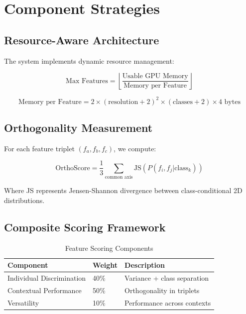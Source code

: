 \documentclass[11pt,a4paper]{article}
\begin{document}
\section{Component Strategies}

\subsection{Resource-Aware Architecture}

The system implements dynamic resource management:

\begin{equation}
\text{Max Features} = \left\lfloor \frac{\text{Usable GPU Memory}}{\text{Memory per Feature}} \right\rfloor
\end{equation}

\begin{equation}
\text{Memory per Feature} = 2 \times (\text{resolution} + 2)^2 \times (\text{classes} + 2) \times 4 \text{ bytes}
\end{equation}

\subsection{Orthogonality Measurement}

For each feature triplet $(f_a, f_b, f_c)$, we compute:

\begin{equation}
\text{OrthoScore} = \frac{1}{3}\sum_{\text{common axis}} \text{JS}(P(f_i,f_j|\text{class}_k))
\end{equation}

Where JS represents Jensen-Shannon divergence between class-conditional 2D distributions.

\subsection{Composite Scoring Framework}

\begin{table}[h!]
\centering
\caption{Feature Scoring Components}
\label{tab:scoring}
\begin{tabular}{lll}
\toprule
\textbf{Component} & \textbf{Weight} & \textbf{Description} \\
\midrule
Individual Discrimination & 40\% & Variance + class separation \\
Contextual Performance & 50\% & Orthogonality in triplets \\
Versatility & 10\% & Performance across contexts \\
\bottomrule
\end{tabular}
\end{table}
\end{document}
